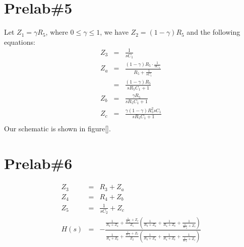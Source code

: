 \documentclass{IEEEtran}
\begin{document}
	\section{\textbf{Prelab\#5}}
	Let $ Z_1 = \gamma R_5 $, where $ 0 \le \gamma \le 1 $, we have $ Z_2 = (1-\gamma)R_5 $ and the following equations:\\
	\begin{eqnarray*}
		Z_3 & = & \frac{1}{sC_1}\\
		Z_a & = & \frac{(1-\gamma)R_5\cdot\frac{1}{sC_1}}{R_5+\frac{1}{sC_1}}\\
			& = & \frac{(1-\gamma) R_5}{sR_5C_1+1}\\
		Z_b & = & \frac{\gamma R_5}{sR_5C_1+1}\\
		Z_c & = & \frac{\gamma (1-\gamma)R_5^2sC_1}{sR_5C_1+1}\\
	\end{eqnarray*}
	Our schematic is shown in figure[].
	
	\section{\textbf{Prelab\#6}}
	\begin{eqnarray*}
		Z_3 & = & R_3 + Z_a\\
		Z_4 & = & R_4 + Z_b\\
		Z_5 & = & \frac{1}{sC_2} + Z_c\\
		H(s) & = & - \frac{\frac{1}{R_3 + Z_a}+\frac{\frac{1}{sC_2} + Z_c}{Z_1} (\frac{1}{R_3 + Z_a}+\frac{1}{R_4 + Z_b}+\frac{1}{\frac{1}{sC_2} + Z_c})} {\frac{1}{R_4 + Z_b}+\frac{\frac{1}{sC_2} + Z_c}{Z_2}(\frac{1}{R_3 + Z_a}+\frac{1}{R_4 + Z_b}+\frac{1}{\frac{1}{sC_2} + Z_c})}
	\end{eqnarray*}
\end{document}
